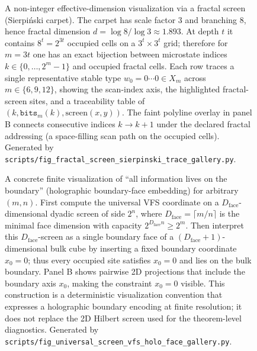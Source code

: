 \begin{figure}[H]
\centering
{}
\caption{A non-integer effective-dimension visualization via a fractal screen (Sierpiński carpet). The carpet has scale factor $3$ and branching $8$, hence fractal dimension $d=\log 8/\log 3\approx 1.893$. At depth $t$ it contains $8^t=2^{3t}$ occupied cells on a $3^t\times 3^t$ grid; therefore for $m=3t$ one has an exact bijection between microstate indices $k\in\{0,\dots,2^m-1\}$ and occupied fractal cells. Each row traces a single representative stable type $w_0=0\cdots 0\in X_m$ across $m\in\{6,9,12\}$, showing the scan-index axis, the highlighted fractal-screen sites, and a traceability table of $(k,\texttt{bits}_m(k),\mathrm{screen}(x,y))$. The faint polyline overlay in panel B connects consecutive indices $k\to k+1$ under the declared fractal addressing (a space-filling scan path on the occupied cells). Generated by \texttt{scripts/fig\_fractal\_screen\_sierpinski\_trace\_gallery.py}.}
\label{fig:fractal_screen_sierpinski_trace_gallery}
\end{figure}

\begin{figure}[H]
\centering
{}
\caption{A concrete finite visualization of ``all information lives on the boundary'' (holographic boundary-face embedding) for arbitrary $(m,n)$. First compute the universal VFS coordinate on a $D_{\mathrm{face}}$-dimensional dyadic screen of side $2^n$, where $D_{\mathrm{face}}=\lceil m/n\rceil$ is the minimal face dimension with capacity $2^{D_{\mathrm{face}}n}\ge 2^m$. Then interpret this $D_{\mathrm{face}}$-screen as a single boundary face of a $(D_{\mathrm{face}}+1)$-dimensional bulk cube by inserting a fixed boundary coordinate $x_0=0$; thus every occupied site satisfies $x_0=0$ and lies on the bulk boundary. Panel B shows pairwise 2D projections that include the boundary axis $x_0$, making the constraint $x_0=0$ visible. This construction is a deterministic visualization convention that expresses a holographic boundary encoding at finite resolution; it does not replace the 2D Hilbert screen used for the theorem-level diagnostics. Generated by \texttt{scripts/fig\_universal\_screen\_vfs\_holo\_face\_gallery.py}.}
\label{fig:universal_screen_vfs_holo_face_gallery}
\end{figure}

